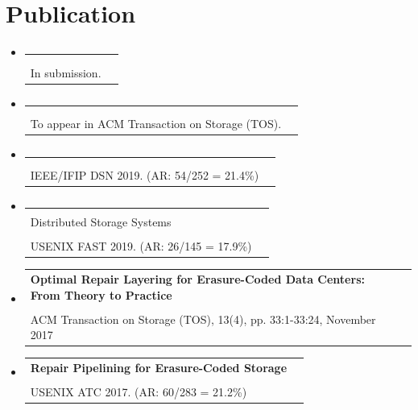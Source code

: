 \documentclass[letterpaper,11pt]{article}
\makeatletter
\newcommand{\resumeSubheading}[4]{
  \vspace{-1pt}\item
    \begin{tabular*}{0.97\textwidth}[t]{l@{\extracolsep{\fill}}r}
      \textbf{#1} & #2 \\
      \textit{\small#3} & \textit{\small #4} \\
    \end{tabular*}\vspace{-5pt}
}
\newcommand{\resumeSubHeadingListStart}{\begin{itemize}[leftmargin=*]}
\newcommand{\resumeSubHeadingListEnd}{\end{itemize}}
\makeatother
\begin{document}
\section{Publication}
  \resumeSubHeadingListStart
    \resumeSubheading
      {\makecell[l]{Fast Predictive Repair in Erasure-Coded Storage: Analysis, Design, and Implementation}}{}
      {\makecell[l]{{\bf Xiaolu Li}, Keyun Cheng, Zhirong Shen, and Patrick P. C. Lee. \\In submission.}}{}
    \resumeSubheading
      {\makecell[l]{Repair Pipelining for Erasure-Coded Storage: Algorithms and Evaluation.}}{}
      {\makecell[l]{{\bf Xiaolu Li}, Zuoru Yang, Jinhong Li, Runhui Li, Patrick P. C. Lee, Qun Huang and Yuchong Hu. \\To appear in ACM Transaction on Storage (TOS).}}{}
    \resumeSubheading
      {\makecell[l]{Fast Predictive Repair in Erasure-Coded Storage}}{}
      {\makecell[l]{Zhirong Shen, {\bf Xiaolu Li} and Patrick P. C. Lee. \\IEEE/IFIP DSN 2019. (AR: 54/252 = 21.4\%)}}{}
    \resumeSubheading
      {\makecell[l]{OpenEC: Toward Unified and Configurable Erasure Coding Management in \\Distributed Storage Systems}}{}
      {\makecell[l]{{\bf Xiaolu Li}, Runhui Li, Patrick P. C. Lee, and Yuchong Hu. \\USENIX FAST 2019. (AR: 26/145 = 17.9\%)}}{}
    \resumeSubheading
      {Optimal Repair Layering for Erasure-Coded Data Centers: From Theory to Practice}{}
      {\makecell[l]{Yuchong Hu, {\bf Xiaolu Li}, Mi Zhang, Patrick P. C. Lee, Xiaoyang Zhang, Pan Zhou, and Dan Feng. \\ACM Transaction on Storage  (TOS), 13(4), pp. 33:1-33:24,
      November 2017}}{}
    \resumeSubheading
      {Repair Pipelining for Erasure-Coded Storage}{}
      {\makecell[l]{Runhui Li, {\bf Xiaolu Li}, Patrick P.C. Lee and Qun Huang. \\USENIX ATC 2017. (AR: 60/283 = 21.2\%)}}{}


  \resumeSubHeadingListEnd

\end{document}

